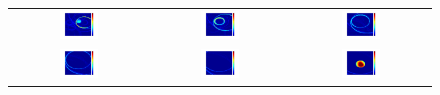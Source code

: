 \begin{figure}[H]
\begin{tabular}{ccc}
	\includegraphics[width=0.3\textwidth]{linea_timerev/figuras/timereversal/ev2/tr230.png}&
	\includegraphics[width=0.3\textwidth]{linea_timerev/figuras/timereversal/ev2/tr231.png}&
	\includegraphics[width=0.3\textwidth]{linea_timerev/figuras/timereversal/ev2/tr232.png}\\
	\includegraphics[width=0.3\textwidth]{linea_timerev/figuras/timereversal/ev2/tr233.png}&
	\includegraphics[width=0.3\textwidth]{linea_timerev/figuras/timereversal/ev2/tr234.png}&
	\includegraphics[width=0.3\textwidth]{linea_timerev/figuras/timereversal/ev2/tr235.png}\\

\end{tabular}
\end{figure}
